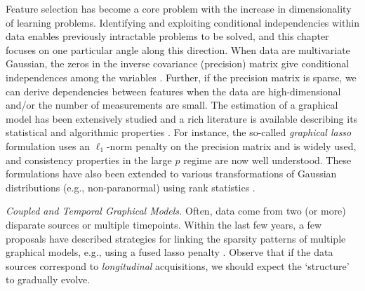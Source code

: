 

Feature selection has become a core problem with the increase in dimensionality of learning problems.
Identifying and exploiting conditional independencies within data enables previously intractable problems to be solved,
and this chapter focuses on one particular angle along this direction.
When data are multivariate Gaussian, the zeros in the inverse covariance (precision) matrix give conditional independences 
among the variables \citep{lauritzen1996graphical}. 
Further, if the precision matrix is sparse, we can
derive dependencies between features when the data are high-dimensional and/or the number of measurements are small. 
The estimation of a graphical model
has been extensively studied
and a rich literature is available describing 
its statistical and algorithmic properties \citep{koller2009probabilistic,jordan1998learning}. 
For instance, the so-called \textit{graphical lasso} formulation uses an $\ell_1$-norm penalty on the 
precision matrix and is widely used, and consistency properties 
in the large $p$ regime \citep{cai2011constrained,friedman2008sparse,yuan2010high} are now well understood.
These formulations have also been extended to various transformations of Gaussian distributions (e.g., non-paranormal)
using rank statistics \citep{liu2009nonparanormal,xue2012regularized,liu2012high}.

{\em Coupled and Temporal Graphical Models.} 
Often, data come from two (or more) disparate sources or multiple timepoints.
Within the last few years, a few proposals have 
described strategies for linking the sparsity patterns of multiple graphical models, e.g., using a fused lasso 
penalty \citep{danaher2014joint} \citep{yang2015fused}. Observe that 
if the data sources correspond to {\em longitudinal} acquisitions, we should expect 
the `structure' to gradually evolve.

